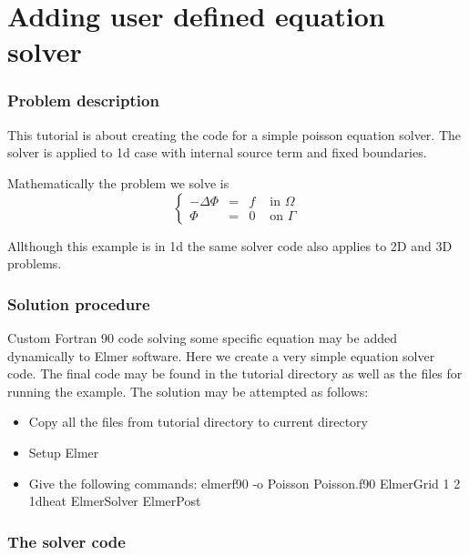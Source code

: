 \chapter{Adding user defined equation solver}


\subsection*{Problem description}

This tutorial is about creating the code for a simple poisson equation solver.
The solver is applied to 1d case with internal source term and fixed boundaries.

Mathematically the problem we solve is
\begin{equation}
\left \{
\begin{array}{cccc}
- \Delta \Phi &= &f & \mbox{ in } \Omega \\
\Phi&=&0 & \mbox{ on } \Gamma
\end{array}
\right .
\end{equation}

Allthough this example is in 1d the same solver code also applies to 2D and 3D
problems.

\subsection*{Solution procedure}

Custom Fortran 90 code solving some specific equation may be added dynamically to Elmer 
software. Here we create a very simple equation solver code. The final code
may be found in the tutorial directory as well as the files for running
the example. The solution may be attempted as follows:

\begin{itemize}
\item Copy all the files from tutorial directory to current directory
\item Setup Elmer
\item Give the following commands:
\ttbegin
elmerf90 -o Poisson Poisson.f90
ElmerGrid 1 2 1dheat
ElmerSolver
ElmerPost
\ttend
\end{itemize}

\subsection*{The solver code}

